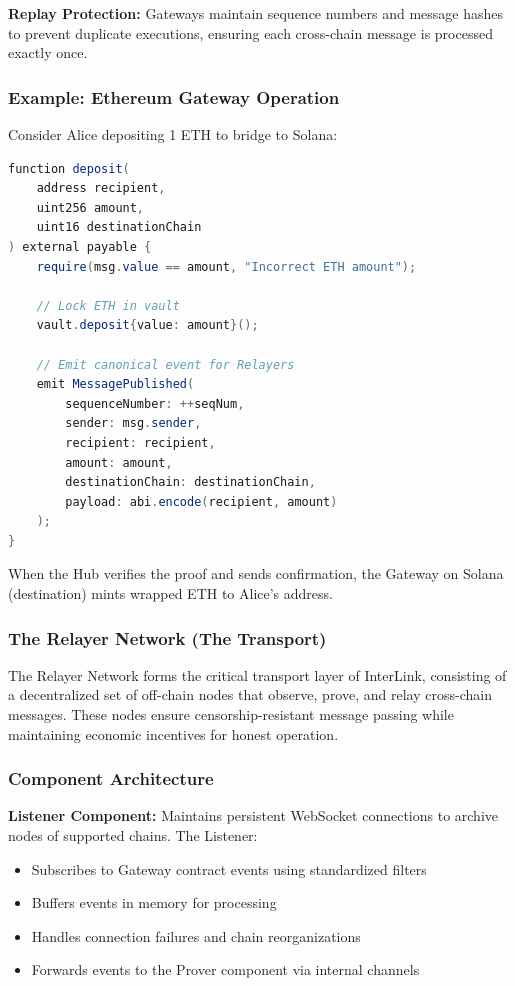 \documentclass[11pt,a4paper]{article}
\begin{document}
\textbf{Replay Protection:} Gateways maintain sequence numbers and message hashes to prevent duplicate executions, ensuring each cross-chain message is processed exactly once.

\subsubsection*{Example: Ethereum Gateway Operation}

Consider Alice depositing 1 ETH to bridge to Solana:

\begin{lstlisting}[language=Java, caption={Ethereum Gateway Deposit Function}]
function deposit(
    address recipient,
    uint256 amount,
    uint16 destinationChain
) external payable {
    require(msg.value == amount, "Incorrect ETH amount");
    
    // Lock ETH in vault
    vault.deposit{value: amount}();
    
    // Emit canonical event for Relayers
    emit MessagePublished(
        sequenceNumber: ++seqNum,
        sender: msg.sender,
        recipient: recipient,
        amount: amount,
        destinationChain: destinationChain,
        payload: abi.encode(recipient, amount)
    );
}
\end{lstlisting}

When the Hub verifies the proof and sends confirmation, the Gateway on Solana (destination) mints wrapped ETH to Alice's address.

\subsubsection{The Relayer Network (The Transport)}

The Relayer Network forms the critical transport layer of InterLink, consisting of a decentralized set of off-chain nodes that observe, prove, and relay cross-chain messages. These nodes ensure censorship-resistant message passing while maintaining economic incentives for honest operation.

\subsubsection*{Component Architecture}

\textbf{Listener Component:} Maintains persistent WebSocket connections to archive nodes of supported chains. The Listener:
\begin{itemize}
    \item Subscribes to Gateway contract events using standardized filters
    \item Buffers events in memory for processing
    \item Handles connection failures and chain reorganizations
    \item Forwards events to the Prover component via internal channels
\end{itemize}
\end{document}
